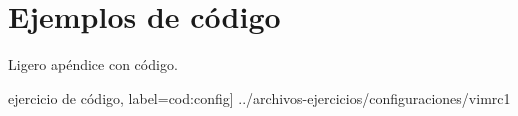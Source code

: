\chapter{Ejemplos de código}

Ligero apéndice con código.


\lstset{style=color2}
 ejercicio de código, label=cod:config] {../archivos-ejercicios/configuraciones/vimrc1}


